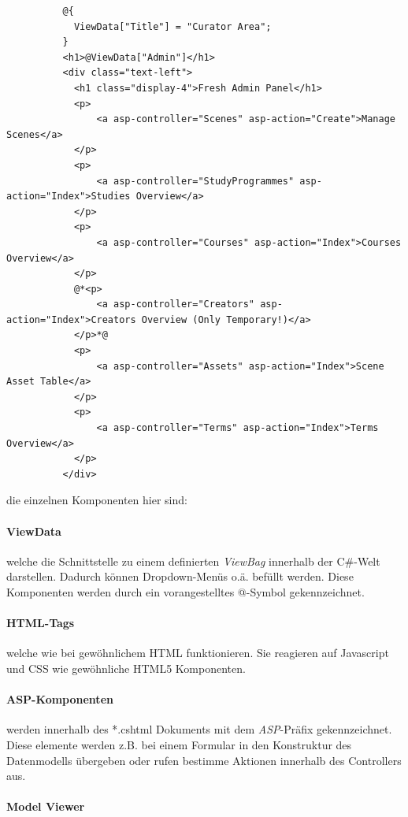 \documentclass[titlepage, a4paper, 11pt]{scrartcl}
\begin{document}
        \begin{lstlisting}          
          @{
            ViewData["Title"] = "Curator Area";
          }
          <h1>@ViewData["Admin"]</h1>
          <div class="text-left">
            <h1 class="display-4">Fresh Admin Panel</h1>
            <p>
                <a asp-controller="Scenes" asp-action="Create">Manage Scenes</a>
            </p>
            <p>
                <a asp-controller="StudyProgrammes" asp-action="Index">Studies Overview</a>
            </p>
            <p>
                <a asp-controller="Courses" asp-action="Index">Courses Overview</a>
            </p>
            @*<p>
                <a asp-controller="Creators" asp-action="Index">Creators Overview (Only Temporary!)</a>
            </p>*@
            <p>
                <a asp-controller="Assets" asp-action="Index">Scene Asset Table</a>
            </p>
            <p>
                <a asp-controller="Terms" asp-action="Index">Terms Overview</a>
            </p>
          </div>
        \end{lstlisting}
        
        die einzelnen Komponenten hier sind:

        \paragraph{ViewData} welche die Schnittstelle zu einem definierten \textit{ViewBag} innerhalb der C\#-Welt darstellen. Dadurch können Dropdown-Menüs o.ä. befüllt werden.
        Diese Komponenten werden durch ein vorangestelltes @-Symbol gekennzeichnet.

        \paragraph{HTML-Tags} welche wie bei gewöhnlichem HTML funktionieren. Sie reagieren auf Javascript und CSS wie gewöhnliche HTML5 Komponenten.

        \paragraph{ASP-Komponenten} werden innerhalb des *.cshtml Dokuments mit dem \textit{ASP}-Präfix gekennzeichnet. Diese elemente werden z.B. bei einem Formular in den Konstruktur
        des Datenmodells übergeben oder rufen bestimme Aktionen innerhalb des Controllers aus.
        
        \paragraph{Model Viewer}
\end{document}
